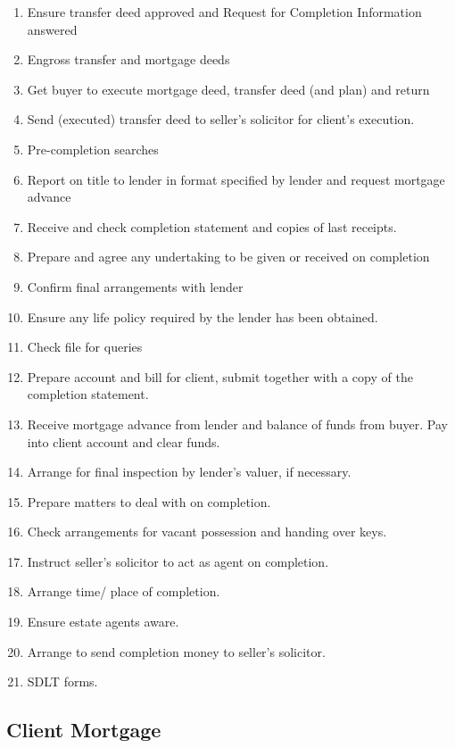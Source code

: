 \documentclass[
]{article}
\providecommand{\tightlist}{%
  \setlength{\itemsep}{0pt}\setlength{\parskip}{0pt}}
\begin{document}
\begin{enumerate}
\tightlist
\item
  Ensure transfer deed approved and Request for Completion Information
  answered
\item
  Engross transfer and mortgage deeds
\item
  Get buyer to execute mortgage deed, transfer deed (and plan) and
  return
\item
  Send (executed) transfer deed to seller's solicitor for client's
  execution.
\item
  Pre-completion searches
\item
  Report on title to lender in format specified by lender and request
  mortgage advance
\item
  Receive and check completion statement and copies of last receipts.
\item
  Prepare and agree any undertaking to be given or received on
  completion
\item
  Confirm final arrangements with lender
\item
  Ensure any life policy required by the lender has been obtained.
\item
  Check file for queries
\item
  Prepare account and bill for client, submit together with a copy of
  the completion statement.
\item
  Receive mortgage advance from lender and balance of funds from buyer.
  Pay into client account and clear funds.
\item
  Arrange for final inspection by lender's valuer, if necessary.
\item
  Prepare matters to deal with on completion.
\item
  Check arrangements for vacant possession and handing over keys.
\item
  Instruct seller's solicitor to act as agent on completion.
\item
  Arrange time/ place of completion.
\item
  Ensure estate agents aware.
\item
  Arrange to send completion money to seller's solicitor.
\item
  SDLT forms.
\end{enumerate}

\hypertarget{client-mortgage}{%
\subsection{Client Mortgage}\label{client-mortgage}}
\end{document}
